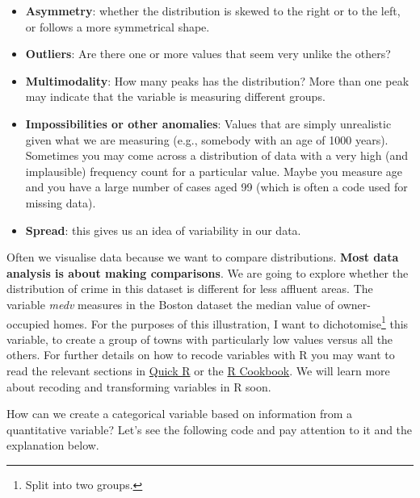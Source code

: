 \documentclass[
]{book}
\newenvironment{Shaded}{\begin{snugshade}}{\end{snugshade}}
\newcommand{\FloatTok}[1]{\textcolor[rgb]{0.00,0.00,0.81}{#1}}
\newcommand{\NormalTok}[1]{#1}
\newcommand{\OtherTok}[1]{\textcolor[rgb]{0.56,0.35,0.01}{#1}}
\newcommand{\SpecialCharTok}[1]{\textcolor[rgb]{0.81,0.36,0.00}{\textbf{#1}}}
\newcommand{\StringTok}[1]{\textcolor[rgb]{0.31,0.60,0.02}{#1}}
\providecommand{\tightlist}{%
  \setlength{\itemsep}{0pt}\setlength{\parskip}{0pt}}
\begin{document}
\begin{itemize}
\tightlist
\item
  \textbf{Asymmetry}: whether the distribution is skewed to the right or to the left, or follows a more symmetrical shape.
\item
  \textbf{Outliers}: Are there one or more values that seem very unlike the others?
\item
  \textbf{Multimodality}: How many peaks has the distribution? More than one peak may indicate that the variable is measuring different groups.
\item
  \textbf{Impossibilities or other anomalies}: Values that are simply unrealistic given what we are measuring (e.g., somebody with an age of 1000 years). Sometimes you may come across a distribution of data with a very high (and implausible) frequency count for a particular value. Maybe you measure age and you have a large number of cases aged 99 (which is often a code used for missing data).
\item
  \textbf{Spread}: this gives us an idea of variability in our data.
\end{itemize}

Often we visualise data because we want to compare distributions. \textbf{Most data analysis is about making comparisons}. We are going to explore whether the distribution of crime in this dataset is different for less affluent areas. The variable \emph{medv} measures in the Boston dataset the median value of owner-occupied homes. For the purposes of this illustration, I want to dichotomise\footnote{Split into two groups.} this variable, to create a group of towns with particularly low values versus all the others. For further details on how to recode variables with R you may want to read the relevant sections in \href{http://www.statmethods.net/management/variables.html}{Quick R} or the \href{http://www.cookbook-r.com/Manipulating_data/Recoding_data/}{R Cookbook}. We will learn more about recoding and transforming variables in R soon.

How can we create a categorical variable based on information from a quantitative variable? Let's see the following code and pay attention to it and the explanation below.

\begin{Shaded}
\end{Shaded}
\end{document}
